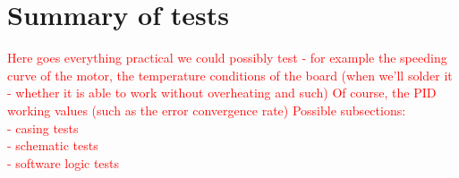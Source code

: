 \section{Summary of tests}
\textcolor{red}{
Here goes everything practical we could possibly test - for example the speeding curve of the motor, the temperature conditions of the board (when we'll solder it - whether it is able to work without overheating and such) 
Of course, the PID working values (such as the error convergence rate)
Possible subsections:\\
    - casing tests \\
    - schematic tests \\
    - software logic tests \\
}

